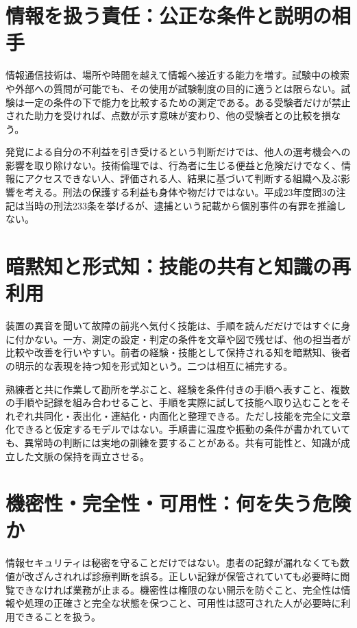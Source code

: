 \section{情報を扱う責任：公正な条件と説明の相手}
\label{theory:information:fairness}
情報通信技術は、場所や時間を越えて情報へ接近する能力を増す。試験中の検索や外部への質問が可能でも、その使用が試験制度の目的に適うとは限らない。試験は一定の条件の下で能力を比較するための測定である。ある受験者だけが禁止された助力を受ければ、点数が示す意味が変わり、他の受験者との比較を損なう。

発覚による自分の不利益を引き受けるという判断だけでは、他人の選考機会への影響を取り除けない。技術倫理では、行為者に生じる便益と危険だけでなく、情報にアクセスできない人、評価される人、結果に基づいて判断する組織へ及ぶ影響を考える。刑法の保護する利益も身体や物だけではない。平成23年度問3の注記は当時の刑法233条を挙げるが、逮捕という記載から個別事件の有罪を推論しない。

\section{暗黙知と形式知：技能の共有と知識の再利用}
\label{theory:information:knowledge}
装置の異音を聞いて故障の前兆へ気付く技能は、手順を読んだだけではすぐに身に付かない。一方、測定の設定・判定の条件を文章や図で残せば、他の担当者が比較や改善を行いやすい。前者の経験・技能として保持される知を暗黙知、後者の明示的な表現を持つ知を形式知という。二つは相互に補完する\parencite{jaist_knowledge}。

熟練者と共に作業して勘所を学ぶこと、経験を条件付きの手順へ表すこと、複数の手順や記録を組み合わせること、手順を実際に試して技能へ取り込むことをそれぞれ共同化・表出化・連結化・内面化と整理できる。ただし技能を完全に文章化できると仮定するモデルではない。手順書に温度や振動の条件が書かれていても、異常時の判断には実地の訓練を要することがある。共有可能性と、知識が成立した文脈の保持を両立させる。

\section{機密性・完全性・可用性：何を失う危険か}
\label{theory:information:cia}
情報セキュリティは秘密を守ることだけではない。患者の記録が漏れなくても数値が改ざんされれば診療判断を誤る。正しい記録が保管されていても必要時に閲覧できなければ業務が止まる。機密性は権限のない開示を防ぐこと、完全性は情報や処理の正確さと完全な状態を保つこと、可用性は認可された人が必要時に利用できることを扱う。

